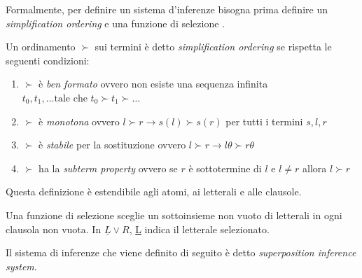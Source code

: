 Formalmente, per definire un sistema d'inferenze bisogna prima definire un \emph{simplification ordering} e una funzione di selezione \cite{kovacs2013first,riazanov2002design}.
\begin{definition}
    Un ordinamento $\succ$ sui termini è detto \emph{simplification ordering} se rispetta le seguenti condizioni:
    \begin{enumerate}
        \item $\succ$ è \emph{ben formato} ovvero non esiste una sequenza infinita $t_0,t_1, \dots \text{tale che } t_0 \succ t_1 \succ \dots$
        \item $\succ$ è \emph{monotona} ovvero $l \succ r \rightarrow s(l)\succ s(r)$ per tutti i termini $s,l,r$
        \item $\succ$ è \emph{stabile} per la sostituzione ovvero $l \succ r \rightarrow l\theta \succ r\theta$
        \item $\succ$ ha la \emph{subterm property} ovvero se $r$ è sottotermine di $l$ e $l\neq r$ allora $l\succ r$   
    \end{enumerate}
\end{definition}
Questa definizione è estendibile agli atomi, ai letterali e alle clausole.
\begin{definition}
    Una funzione di selezione sceglie un sottoinsieme non vuoto di letterali in ogni clausola non vuota. In $\underline{L}\lor R$, \underline{L} indica il letterale selezionato.
\end{definition}
Il sistema di inferenze che viene definito di seguito è detto \emph{superposition inference system}.
